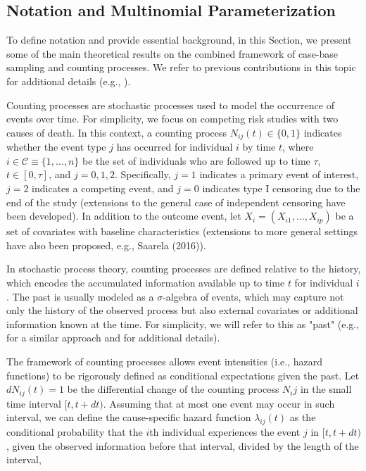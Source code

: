 \documentclass[AMA,Times1COL]{WileyNJDv5} %
\begin{document}
\subsection{Notation and Multinomial Parameterization}

To define notation and provide essential background, in this Section, we present some of the main theoretical results on the combined framework of case-base sampling and counting processes. We refer to previous contributions in this topic for additional details (e.g., \cite{SaarelaArjas:2015, AalenBorganGjessing:2008, ArjasHaara:1987}).

Counting processes are stochastic processes used to model the occurrence of events over time. For simplicity, we focus on competing risk studies with two causes of death. In this context, a counting process $N_{ij}(t) \in \{0,1\}$ indicates whether the event type $j$ has occurred for individual $i$ by time $t$, where $i \in \mathcal{C} \equiv \{1, \ldots, n\}$ be the set of individuals who are followed up to time $\tau$, $t \in [0, \tau]$, and $j = 0,1,2$. Specifically, $j = 1$ indicates a primary event of interest, $j = 2$ indicates a competing event, and $j = 0$ indicates type I censoring due to the end of the study (extensions to the general case of independent censoring have been developed).\cite{Saarela:2016} In addition to the outcome event, let $X_i = (X_{i1}, \ldots, X_{ip})$ be a set of covariates with baseline characteristics (extensions to more general settings have also been proposed, e.g., Saarela (2016)\cite{Saarela:2016}).

In stochastic process theory, counting processes are defined relative to the history, which encodes the accumulated information available up to time $t$ for individual $i$. The past is usually modeled as a $\sigma$-algebra of events, which may capture not only the history of the observed process but also external covariates or additional information known at the time. For simplicity, we will refer to this as "past" (e.g., for a similar approach and for additional details).\cite{AalenBorganGjessing:2008, BhatnagarTurgeonIslam:2022, SaarelaArjas:2015}

The framework of counting processes allows event intensities (i.e., hazard functions) to be rigorously defined as conditional expectations given the past. Let $dN_{ij}(t) = 1$ be the differential change of the counting process $N_ij$ in the small time interval $[t, t + dt)$. Assuming that at most one event may occur in such interval, we can define the cause-specific hazard function $\lambda_{ij}(t)$ as the conditional probability that the $i$th individual experiences the event $j$ in $[t, t + dt)$, given the observed information before that interval, divided by the length of the interval,
\end{document}
